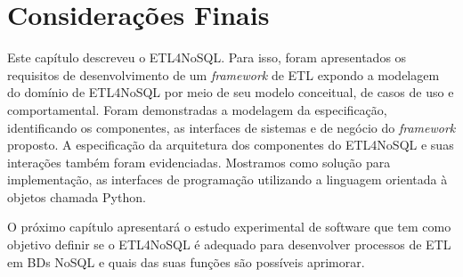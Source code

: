 






\section{Considerações Finais}

Este capítulo descreveu o ETL4NoSQL. Para isso, foram apresentados os requisitos de desenvolvimento de um \textit{framework} de ETL expondo a modelagem do domínio de ETL4NoSQL por meio de seu modelo conceitual, de casos de uso e comportamental. Foram demonstradas a modelagem da especificação, identificando os componentes, as interfaces de sistemas e de negócio do  \textit{framework} proposto. A especificação da arquitetura dos componentes do ETL4NoSQL e suas interações também foram evidenciadas. Mostramos como solução para implementação, as interfaces de programação utilizando a linguagem orientada à objetos chamada Python.

O próximo capítulo apresentará o estudo experimental de software que tem como objetivo definir se o ETL4NoSQL é adequado para desenvolver processos de ETL em BDs NoSQL e quais das suas funções são possíveis aprimorar.



